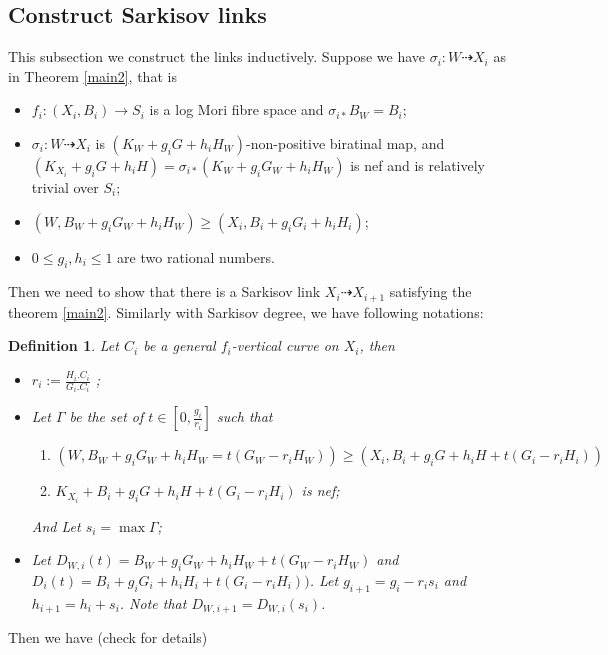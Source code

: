 \documentclass{article}
\newtheorem{defn}{Definition}[subsection]
\begin{document}
\subsection{Construct Sarkisov links}
This subsection we construct the links inductively. Suppose we have $\sigma_{i}:W\dashrightarrow X_{i}$ as in Theorem  \ref{main2}, that is 
\begin{itemize}
  \item $f_{i}:(X_{i},B_{i})\to S_{i}$ is a log Mori fibre space and $\sigma_{i*} B_{W}=B_{i}$;
  \item $\sigma_{i}:W\dashrightarrow  X_{i}$ is $(K_{W}+g_{i}G+h_{i}H_{W})$-non-positive biratinal map, and $(K_{X_{i}}+g_{i}G+h_{i}H)=\sigma_{i*}(K_{W}+g_{i}G_{W}+h_{i}H_{W})$ is nef and is relatively trivial over $S_{i}$;
  \item $(W,B_{W}+g_{i}G_{W}+h_{i}H_{W})\geqslant (X_{i},B_{i}+g_{i}G_{i}+h_{i}H_{i})$;
  \item $0\leqslant g_{i},h_{i}\leqslant 1$ are two rational numbers.
\end{itemize}
Then we need to show that there is a Sarkisov link $X_{i}\dashrightarrow X_{i+1}$ satisfying the theorem \ref{main2}. Similarly with Sarkisov degree, we have following notations:
\begin{defn}
  Let $C_{i}$ be a general $f_{i}$-vertical curve on $X_{i}$, then
  \begin{itemize}
    \item $r_{i}:=\frac{H_{i}.C_{i}}{G_{i}.C_{i}}$ ;
    \item Let $\Gamma$ be the set of $t\in [0,\frac{g_{i}}{r_{i}}] $ such that 
      \begin{enumerate}
        \item\label{nefcondition} $\left(W,B_{W}+g_{i}G_{W}+h_{i}H_{W}=t(G_{W}-r_{i}H_{W})\right)\geqslant \left(X_{i},B_{i}+g_{i}G+h_{i}H+t\left(G_{i}-r_{i}H_{i}\right)\right)$
        \item\label{singularcondition} $K_{X_{i}}+B_{i}+g_{i}G+h_{i}H+t(G_{i}-r_{i}H_{i})$ is nef;
    \end{enumerate}
    And Let $s_{i}=\max \Gamma $;
\item Let $D_{W,i}(t)=B_{W}+g_{i}G_{W}+h_{i}H_{W}+t(G_{W}-r_{i}H_{W})$ and $D_{i}(t)=B_{i}+g_{i}G_{i}+h_{i}H_{i}+t\left(G_{i}-r_{i}H_{i}\right))$. Let $g_{i+1}=g_{i}-r_{i}s_{i}$ and $h_{i+1}=h_{i}+s_{i}$. Note that $D_{W,i+1}=D_{W,i}(s_{i})$. 
  \end{itemize}
\end{defn}
Then we have (check \cite[Lemma 4.4]{liuSarkisovProgramGeneralized2019} for details)
\end{document}
